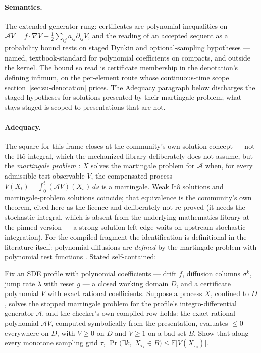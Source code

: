\paragraph{Semantics.} The extended-generator rung: certificates are
polynomial inequalities on $\mathcal{A}V = f \cdot \nabla V +
\tfrac12 \sum_{ij} a_{ij} \partial_{ij} V$, and the reading of an
accepted sequent as a probability bound rests on staged Dynkin and
optional-sampling hypotheses --- named, textbook-standard for
polynomial coefficients on compacts, and outside the kernel. The
bound so read is certificate membership in the denotation's defining
infimum, on the per-element route whose continuous-time scope
section~\ref{sec:su-denotation} prices. The Adequacy paragraph below
discharges the staged hypotheses for solutions presented by their
martingale problem; what stays staged is scoped to presentations that
are not.

\paragraph{Adequacy.} The square for this frame closes at the
community's own solution concept --- not the It\^o integral, which
the mechanized library deliberately does not assume, but the
\emph{martingale problem}
\cite{stroock-varadhan-1979, ethier-kurtz-1986}: $X$ solves the
martingale problem for $\mathcal{A}$ when, for every admissible test
observable $V$, the compensated process
$V(X_t) - \int_0^t (\mathcal{A}V)(X_s)\,ds$ is a martingale. Weak
It\^o solutions and martingale-problem solutions coincide; that
equivalence is the community's own theorem, cited here as the licence
and deliberately not re-proved (it needs the stochastic integral,
which is absent from the underlying mathematics library at the pinned
version --- a strong-solution left edge waits on upstream stochastic
integration). For the compiled fragment the identification is
definitional in the literature itself: polynomial diffusions are
\emph{defined} by the martingale problem with polynomial test
functions \cite{filipovic-larsson-2016}. Stated self-contained:

\begin{problem}
\label{prob:mt-sde}
Fix an SDE profile with polynomial coefficients ---
drift $f$, diffusion columns $\sigma^k$, jump rate $\lambda$ with
reset $g$ --- a closed working domain $D$, and a certificate
polynomial $V$ with exact rational coefficients. Suppose a process
$X$, confined to $D$, solves the stopped martingale problem for the
profile's integro-differential generator $\mathcal{A}$, and the
checker's own compiled row holds: the exact-rational polynomial
$\mathcal{A}V$, computed symbolically from the presentation,
evaluates $\le 0$ everywhere on $D$, with $V \ge 0$ on $D$ and
$V \ge 1$ on a bad set $B$. Show that along every monotone sampling
grid $\tau$,
$\Pr\big(\exists k,\; X_{\tau_k} \in B\big)
  \le \mathbb{E}\big[V(X_{\tau_0})\big]$.
\end{problem}

